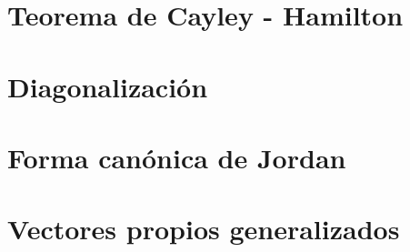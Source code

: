 
\section{Teorema de Cayley - Hamilton}


\section{Diagonalización}


\section{Forma canónica de Jordan}


\section{Vectores propios generalizados}
